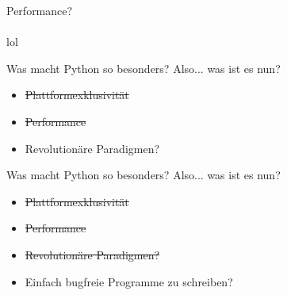 \documentclass{beamer}
\begin{document}
{
  \begin{frame}[plain]
  \end{frame}
}

\begin{frame}
\begin{center}
{ \Huge Performance?}\\~\\
lol
\end{center}
\end{frame}

\begin{frame}[t]{Was macht Python so besonders?}
Also... was ist es nun?
\pause
\begin{itemize}
\item \sout{Plattformexklusivität}
\pause
\item \sout{Performance}
\pause
\item Revolutionäre Paradigmen?
\end{itemize}
\end{frame}

\begin{frame}[t]{Was macht Python so besonders?}
Also... was ist es nun?
\begin{itemize}
\item \sout{Plattformexklusivität}
\item \sout{Performance}
\item \sout{Revolutionäre Paradigmen?}
\item Einfach bugfreie Programme zu schreiben? %
\end{itemize}
\end{frame}
\end{document}
